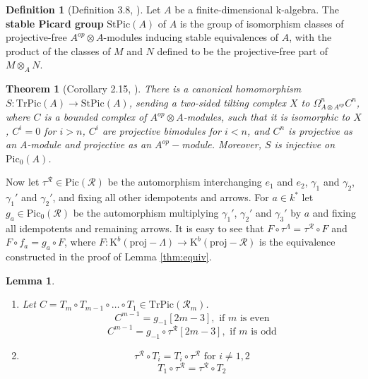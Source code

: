 \documentclass[12pt]{amsart}
\theoremstyle{plain}
\newtheorem{lemma}{Lemma}%
\newtheorem{theorem}{Theorem}%
\theoremstyle{remark}
\theoremstyle{definition}
\newtheorem{definition}{Definition}[section]
\newcommand{\proj}{{\mathrm{proj}}}
\newcommand{\Pic}{{\mathrm{Pic}}}
\newcommand{\TrPic}{{\mathrm{TrPic}}}
\newcommand{\StPic}{{\mathrm{StPic}}}
\newcommand{\K}{{\mathrm{K}}}
\def\kk{\mathrm{k}}
\begin{document}
\begin{definition}[Definition 3.8, \cite{RZ}]\label{thm:stable} Let $A$ be a finite-dimensional $\kk$-algebra. The {\bf stable Picard group} $\StPic(A)$ of $A$ is the group of isomorphism classes of projective-free $A^{op} \otimes A$-modules inducing stable equivalences of $A$, with the product of the classes of $M$ and $N$ defined to be the projective-free part of $M \otimes_A N$. 
 \end{definition}
 
 \begin{theorem}[Corollary 2.15, \cite{RZ}] There is a canonical homomorphism $S \colon \TrPic(A) \to \StPic(A)$, sending a two-sided tilting complex $X$ to $\Omega^n_{A\otimes A^{op}}C^n$, where $C$ is a bounded complex of $A^{op} \otimes A$-modules, such that it is isomorphic to $X$, $C^i = 0$ for $i > n$, $C^i$ are projective bimodules for $i < n$, and $C^n$ is projective as an $A$-module and projective as an $A^{op}-$module. Moreover, $S$ is injective on $\Pic_0(A)$.   \end{theorem} 
 
 Now let $\tau^{\mathcal{R}} \in \Pic(\mathcal{R})$ be the automorphism interchanging $e_1$ and $e_2$, $\gamma_1$ and $\gamma_2$, $\gamma_1'$ and $\gamma_2'$, and fixing all other idempotents and arrows. For $a \in k^*$ let $g_a \in \Pic_0(\mathcal{R})$ be the automorphism multiplying $\gamma_1'$, $\gamma_2'$ and $\gamma_3'$ by $a$ and fixing all idempotents and remaining arrows. It is easy to see that $F \circ \tau^{\Lambda} =  \tau^{\mathcal{R}} \circ F$ and $F \circ f_a =  g_a \circ F$, where $F \colon \K^b(\proj-\Lambda) \to \K^b(\proj-\mathcal{R})$ is the equivalence constructed in the proof of Lemma \ref{thm:equiv}.

\begin{lemma}\label{thm:zentrum} \begin{enumerate}
    \item   Let $C = T_m \circ T_{m-1} \circ \dots \circ T_1  \in \TrPic(\mathcal{R}_m)$. $$ C^{m-1} = g_{-1} [2m-3], \text{ if } m  \text{ is even}$$ 
$$ C^{m-1} = g_{-1} \circ \tau^{\mathcal{R}} [2m-3], \text{ if } m  \text{ is odd}$$ 
\item $$\tau^{\mathcal{R}} \circ T_i = T_i \circ \tau^{\mathcal{R}} \text{ for } i \neq 1,2$$
$$T_1 \circ \tau^{\mathcal{R}} =  \tau^{\mathcal{R}} \circ T_2$$
\end{enumerate}
\end{lemma} 
\end{document}
